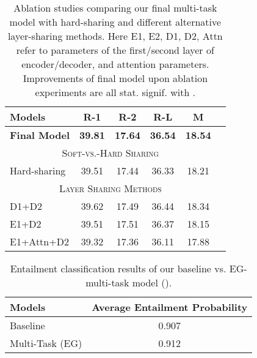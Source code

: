 \documentclass[11pt,a4paper]{article}
\begin{document}
\begin{table}[t]
\begin{center}
\begin{small}
\begin{tabular}{|l|c|c|c|c|c|}
\hline
Models & R-1 & R-2 & R-L & M\\
\hline
\textbf{Final Model} & \textbf{39.81} & \textbf{17.64} & \textbf{36.54} & \textbf{18.54} \\
\hline
\multicolumn{5}{|c|}{\textsc{Soft-vs.-Hard Sharing}}\\
\hline
Hard-sharing & 39.51 & 17.44 & 36.33 & 18.21 \\
\hline
\multicolumn{5}{|c|}{\textsc{Layer Sharing Methods}}\\
\hline
D1+D2 & 39.62 & 17.49 & 36.44 & 18.34 \\
E1+D2 & 39.51 & 17.51 & 36.37 & 18.15 \\
E1+Attn+D2 & 39.32 & 17.36 & 36.11 & 17.88 \\
\hline
\end{tabular}
\end{small}
\end{center}
\vspace{-10pt}
\caption{Ablation studies comparing our final multi-task model with hard-sharing and different alternative layer-sharing methods. Here E1, E2, D1, D2, Attn refer to parameters of the first/second layer of encoder/decoder, and attention parameters. Improvements of final model upon ablation experiments are all stat. signif. with
.
}
\label{table:ablation-studies}
\end{table}

\begin{table}[t]
\begin{small}
\begin{center}
\begin{tabular}{|l|c|}
\hline
Models & Average Entailment Probability \\
\hline
Baseline &  0.907 \\
Multi-Task (EG) & 0.912 \\
\hline
\end{tabular}
\end{center}
\vspace{-10pt}
\caption{Entailment classification results of our baseline vs. EG-multi-task model ().}
\label{table:entailment_analysis_results}
\vspace{-5pt}
\end{small}
\end{table}
\end{document}
